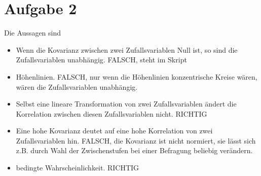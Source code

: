 \documentclass{article}
\begin{document}
	\section*{Aufgabe 2}
	Die Aussagen sind
	\begin{itemize}
		\item Wenn die Kovarianz zwischen zwei Zufallsvariablen Null ist, so sind die Zufallsvariablen unabhängig. FALSCH, steht im Skript
		\item Höhenlinien. FALSCH, nur wenn die Höhenlinien konzentrische Kreise wären, wären die Zufallsvariablen unabhängig.
		\item Selbst eine lineare Transformation von zwei Zufallsvariablen ändert die Korrelation zwischen diesen Zufallsvariablen nicht. RICHTIG
		\item Eine hohe Kovarianz deutet auf eine hohe Korrelation von zwei Zufallsvariablen hin. FALSCH, die Kovarianz ist nicht normiert, sie lässt sich z.B. durch Wahl der Zwischenstufen bei einer Befragung beliebig verändern.
		\item bedingte Wahrscheinlichkeit. RICHTIG
	\end{itemize}	
\end{document}
